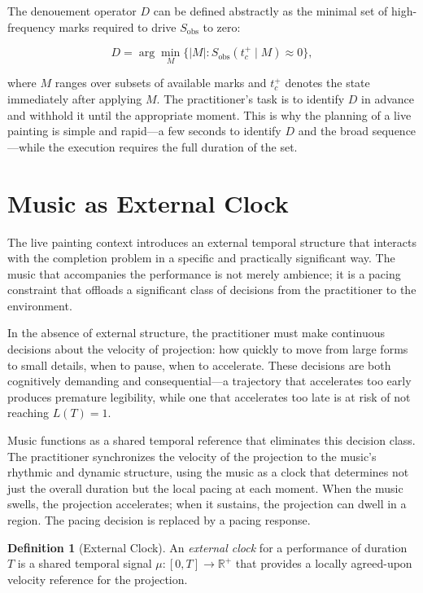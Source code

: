 \documentclass[11pt, twoside]{article}
\theoremstyle{plain}
\theoremstyle{definition}
\newtheorem{definition}[theorem]{Definition}
\theoremstyle{remark}
\begin{document}
The denouement operator $D$ can be defined abstractly as the minimal set of high-frequency marks required to drive $S_{\text{obs}}$ to zero:

\[
D = \arg\min_{M} \{ |M| : S_{\text{obs}}(t_c^+ \mid M) \approx 0 \},
\]

where $M$ ranges over subsets of available marks and $t_c^+$ denotes the state immediately after applying $M$. The practitioner's task is to identify $D$ in advance and withhold it until the appropriate moment. This is why the planning of a live painting is simple and rapid---a few seconds to identify $D$ and the broad sequence---while the execution requires the full duration of the set.

\section{Music as External Clock}
\label{sec:music}

The live painting context introduces an external temporal structure that interacts with the completion problem in a specific and practically significant way. The music that accompanies the performance is not merely ambience; it is a pacing constraint that offloads a significant class of decisions from the practitioner to the environment.

In the absence of external structure, the practitioner must make continuous decisions about the velocity of projection: how quickly to move from large forms to small details, when to pause, when to accelerate. These decisions are both cognitively demanding and consequential---a trajectory that accelerates too early produces premature legibility, while one that accelerates too late is at risk of not reaching $L(T) = 1$.

Music functions as a shared temporal reference that eliminates this decision class. The practitioner synchronizes the velocity of the projection to the music's rhythmic and dynamic structure, using the music as a clock that determines not just the overall duration but the local pacing at each moment. When the music swells, the projection accelerates; when it sustains, the projection can dwell in a region. The pacing decision is replaced by a pacing response.

\begin{definition}[External Clock]
An \emph{external clock} for a performance of duration $T$ is a shared temporal signal $\mu : [0, T] \to \mathbb{R}^+$ that provides a locally agreed-upon velocity reference for the projection.
\end{definition}
\end{document}
